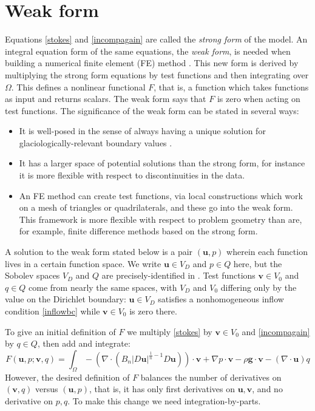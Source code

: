 \documentclass[letterpaper,final,12pt,reqno]{amsart}
\newcommand{\bu}{\mathbf{u}}
\newcommand{\bv}{\mathbf{v}}
\begin{document}
\section{Weak form} \label{sec:weakform}

Equations \eqref{stokes} and \eqref{incompagain} are called the \emph{strong form} of the model.  An integral equation form of the same equations, the \emph{weak form}, is needed when building a numerical finite element (FE) method \cite{Elmanetal2014}.  This new form is derived by multiplying the strong form equations by test functions and then integrating over $\Omega$.  This defines a nonlinear functional $F$, that is, a function which takes functions as input and returns scalars.  The weak form says that $F$ is zero when acting on test functions.  The significance of the weak form can be stated in several ways:
\begin{itemize}
\item It is well-posed in the sense of always having a unique solution  for glaciologically-relevant boundary values \cite{JouvetRappaz2011}.
\item It has a larger space of potential solutions than the strong form, for instance it is more flexible with respect to discontinuities in the data.
\item An FE method can create test functions, via local constructions which work on a mesh of triangles or quadrilaterals, and these go into the weak form.  This framework is more flexible with respect to problem geometry than are, for example, finite difference methods based on the strong form.
\end{itemize}

A solution to the weak form stated below is a pair $(\bu,p)$ wherein each function lives in a certain function space.  We write $\bu\in V_D$ and $p \in Q$ here, but the Sobolev spaces $V_D$ and $Q$ are precisely-identified in \cite{JouvetRappaz2011}.  Test functions $\bv\in V_0$ and $q\in Q$ come from nearly the same spaces, with $V_D$ and $V_0$ differing only by the value on the Dirichlet boundary: $\bu\in V_D$ satisfies a nonhomogeneous inflow condition \eqref{inflowbc} while $\bv\in V_0$ is zero there.

To give an initial definition of $F$ we multiply \eqref{stokes} by $\bv\in V_0$ and \eqref{incompagain} by $q\in Q$, then add and integrate:
\begin{equation}
F(\bu,p;\bv,q) = \int_\Omega - \left(\nabla \cdot \left(B_n |D\bu|^{\frac{1}{n} - 1} D\bu\right)\right)\cdot \bv + \nabla p \cdot \bv - \rho \mathbf{g} \cdot \bv - \left(\nabla \cdot \bu\right) q \label{nonfuncone}
\end{equation}
However, the desired definition of $F$ balances the number of derivatives on $(\bv,q)$ versus $(\bu,p)$, that is, it has only first derivatives on $\bu,\bv$, and no derivative on $p,q$.  To make this change we need integration-by-parts.
\end{document}
